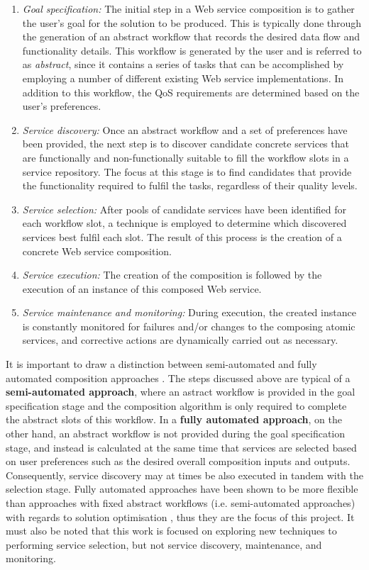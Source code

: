 \begin{enumerate}
 \item \textit{Goal specification:} The initial step in a Web service composition is to gather the user's goal for the solution to be produced. This is typically done through the generation of an abstract workflow that records the desired data flow and functionality details. This workflow is generated by the user and is referred to as \textit{abstract}, since it contains a series of tasks that can be accomplished by employing a number of different existing Web service implementations. In addition to this workflow, the QoS requirements are determined based on the user's preferences.
 \item \textit{Service discovery:} Once an abstract workflow and a set of preferences have been provided, the next step is to discover candidate concrete services that are functionally and non-functionally suitable to fill the workflow slots in a service repository. The focus at this stage is to find candidates that provide the functionality required to fulfil the tasks, regardless of their quality levels.
 \item \textit{Service selection:} After pools of candidate services have been identified for each workflow slot, a technique is employed to determine which discovered services best fulfil each slot. The result of this process is the creation of a concrete Web service composition.
 \item \textit{Service execution:} The creation of the composition is followed by the execution of an instance of this composed Web service.
 \item \textit{Service maintenance and monitoring:} During execution, the created instance is constantly monitored for failures and/or changes to the composing atomic services, and corrective actions are dynamically carried out as necessary.
\end{enumerate}

It is important to draw a distinction between semi-automated and fully automated composition approaches \cite{rao2005survey}. The steps discussed above are typical of a \textbf{semi-automated approach}, where an astract workflow is provided in the goal specification stage and the composition algorithm is only required to complete the abstract slots of this workflow. In a \textbf{fully automated approach}, on the other hand, an abstract workflow is not provided during the goal specification stage, and instead is calculated at the same time that services are selected based on user preferences such as the desired overall composition inputs and outputs. Consequently, service discovery may at times be also executed in tandem with the selection stage. Fully automated approaches have been shown to be more flexible than approaches with fixed abstract workflows (i.e. semi-automated approaches) with regards to solution optimisation \cite{da2014graph}, thus they are the focus of this project. It must also be noted that this work is focused on exploring new techniques to performing service selection, but not service discovery, maintenance, and monitoring.

